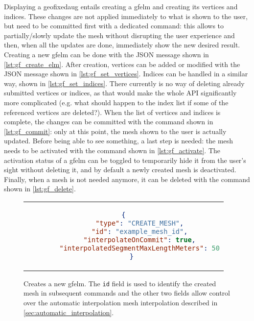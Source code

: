 Displaying a \gls{geofixedaug} entails creating a \gls{gfelm} and creating its vertices and indices. These changes are not applied immediately to what is shown to the user, but need to be committed first with a dedicated command: this allows to partially/slowly update the mesh without disrupting the user experience and then, when all the updates are done, immediately show the new desired result. Creating a new \gls{gfelm} can be done with the JSON message shown in \autoref{lst:gf_create_elm}. After creation, vertices can be added or modified with the JSON message shown in \autoref{lst:gf_set_vertices}. Indices can be handled in a similar way, shown in \autoref{lst:gf_set_indices}. There currently is no way of deleting already submitted vertices or indices, as that would make the whole \gls{API} significantly more complicated (e.g. what should happen to the index list if some of the referenced vertices are deleted?). When the list of vertices and indices is complete, the changes can be committed with the command shown in \autoref{lst:gf_commit}: only at this point, the mesh shown to the user is actually updated. Before being able to see something, a last step is needed: the mesh needs to be activated with the command shown in \autoref{lst:gf_activate}. The activation status of a \gls{gfelm} can be toggled to temporarily hide it from the user's sight without deleting it, and by default a newly created mesh is deactivated. Finally, when a mesh is not needed anymore, it can be deleted with the command shown in \autoref{lst:gf_delete}.

\begin{figure}
  \centering
  \begin{tabular}{c}
  \begin{lstlisting}[language=json]
    {
        "type": "CREATE_MESH",
        "id": "example_mesh_id",
        "interpolateOnCommit": true,
        "interpolatedSegmentMaxLengthMeters": 50
    }
  \end{lstlisting}
  \end{tabular}
  \caption{Creates a new \gls{gfelm}. The \texttt{id} field is used to identify the created mesh in subsequent commands and the other two fields allow control over the automatic interpolation mesh interpolation described in \autoref{sec:automatic_interpolation}.}\label{lst:gf_create_elm}
\end{figure}

